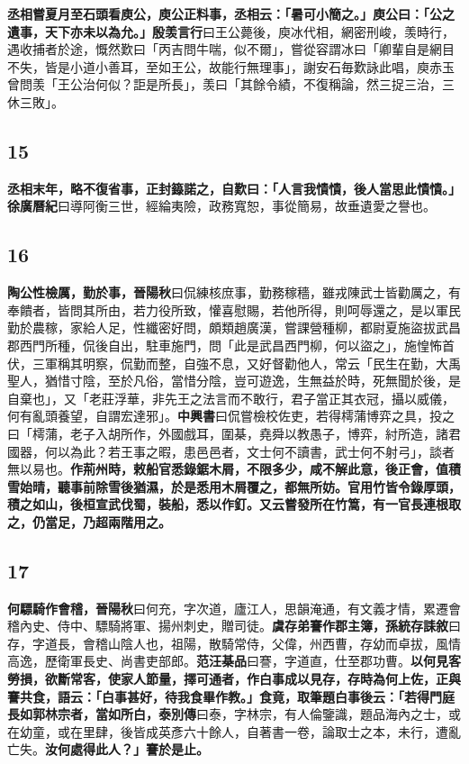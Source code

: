 \textbf{丞相嘗夏月至石頭看庾公，庾公正料事，丞相云：「暑可小簡之。」庾公曰：「公之遺事，天下亦未以為允。」}{\footnotesize \textbf{殷羡言行}曰王公薨後，庾冰代相，網密刑峻，羡時行，遇收捕者於途，慨然歎曰「丙吉問牛喘，似不爾」，嘗從容謂冰曰「卿輩自是網目不失，皆是小道小善耳，至如王公，故能行無理事」，謝安石毎歎詠此唱，庾赤玉曾問羡「王公治何似？詎是所長」，羡曰「其餘令績，不復稱論，然三捉三治，三休三敗」。}

\subsection*{15}

\textbf{丞相末年，略不復省事，正封籙諾之，自歎曰：「人言我憒憒，後人當思此憒憒。」}{\footnotesize \textbf{徐廣曆紀}曰導阿衡三世，經綸夷險，政務寬恕，事從簡易，故垂遺愛之譽也。}

\subsection*{16}

\textbf{陶公性檢厲，勤於事，}{\footnotesize \textbf{晉陽秋}曰侃練核庶事，勤務稼穡，雖戎陳武士皆勸厲之，有奉饋者，皆問其所由，若力役所致，懽喜慰賜，若他所得，則呵辱還之，是以軍民勤於農稼，家給人足，性纖密好問，頗類趙廣漢，嘗課營種柳，都尉夏施盜拔武昌郡西門所種，侃後自出，駐車施門，問「此是武昌西門柳，何以盜之」，施惶怖首伏，三軍稱其明察，侃勤而整，自強不息，又好督勸他人，常云「民生在勤，大禹聖人，猶惜寸陰，至於凡俗，當惜分陰，豈可遊逸，生無益於時，死無聞於後，是自棄也」，又「老莊浮華，非先王之法言而不敢行，君子當正其衣冠，攝以威儀，何有亂頭養望，自謂宏達邪」。\textbf{中興書}曰侃嘗檢校佐吏，若得樗蒲博弈之具，投之曰「樗蒲，老子入胡所作，外國戲耳，圍棊，堯舜以教愚子，博弈，紂所造，諸君國器，何以為此？若王事之暇，患邑邑者，文士何不讀書，武士何不射弓」，談者無以易也。}\textbf{作荊州時，敕船官悉錄鋸木屑，不限多少，咸不解此意，後正會，值積雪始晴，聽事前除雪後猶濕，於是悉用木屑覆之，都無所妨。官用竹皆令錄厚頭，積之如山，後桓宣武伐蜀，裝船，悉以作釘。又云嘗發所在竹篙，有一官長連根取之，仍當足，乃超兩階用之。}

\subsection*{17}

\textbf{何驃騎作會稽，}{\footnotesize \textbf{晉陽秋}曰何充，字次道，廬江人，思韻淹通，有文義才情，累遷會稽內史、侍中、驃騎將軍、揚州刺史，贈司徒。}\textbf{虞存弟謇作郡主簿，}{\footnotesize \textbf{孫統存誄敘}曰存，字道長，會稽山陰人也，祖陽，散騎常侍，父偉，州西曹，存幼而卓拔，風情高逸，歷衛軍長史、尚書吏部郎。\textbf{范汪棊品}曰謇，字道直，仕至郡功曹。}\textbf{以何見客勞損，欲斷常客，使家人節量，擇可通者，作白事成以見存，存時為何上佐，正與謇共食，語云：「白事甚好，待我食畢作教。」食竟，取筆題白事後云：「若得門庭長如郭林宗者，當如所白，}{\footnotesize \textbf{泰別傳}曰泰，字林宗，有人倫鑒識，題品海內之士，或在幼童，或在里肆，後皆成英彥六十餘人，自著書一卷，論取士之本，未行，遭亂亡失。}\textbf{汝何處得此人？」謇於是止。}

